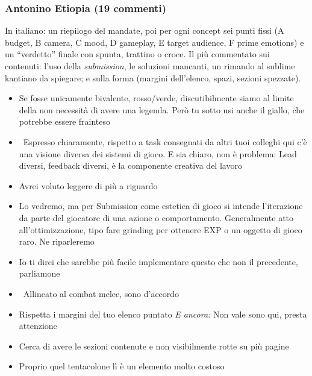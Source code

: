\subsubsection{Antonino Etiopia (19 commenti)}
In italiano: un riepilogo del mandate, poi per ogni concept sei punti fissi (A budget, B camera, C mood, D gameplay, E target audience, F prime emotions) e un ``verdetto'' finale con spunta, trattino o croce. Il più commentato sui contenuti: l'uso della \emph{submission}, le soluzioni mancanti, un rimando al sublime kantiano da spiegare; e sulla forma (margini dell'elenco, spazi, sezioni spezzate).
{\small
\begin{itemize}
  \item {} Se fosse unicamente bivalente, rosso/verde, discutibilmente siamo al limite della non necessità di avere una legenda. Però tu sotto usi anche il giallo, che potrebbe essere frainteso
  \item {} \rvBene\ Espresso chiaramente, rispetto a task consegnati da altri tuoi colleghi qui c'è una visione diversa dei sistemi di gioco. E sia chiaro, non è problema: Lead diversi, feedback diversi, è la componente creativa del lavoro
  \item {} Avrei voluto leggere di più a riguardo
  \item {} Lo vedremo, ma per Submission come estetica di gioco si intende l'iterazione da parte del giocatore di una azione o comportamento. Generalmente atto all'ottimizzazione, tipo fare grinding per ottenere EXP o un oggetto di gioco raro. Ne riparleremo
  \item {} Io ti direi che sarebbe più facile implementare questo che non il precedente, parliamone
  \item {} \rvBene\ Allineato al combat melee, sono d'accordo
  \item {} Rispetta i margini del tuo elenco puntato \emph{E ancora:} Non vale sono qui, presta attenzione
  \item {} Cerca di avere le sezioni contenute e non visibilmente rotte su più pagine
  \item {} Proprio quel tentacolone lì è un elemento molto costoso

\end{itemize}}
